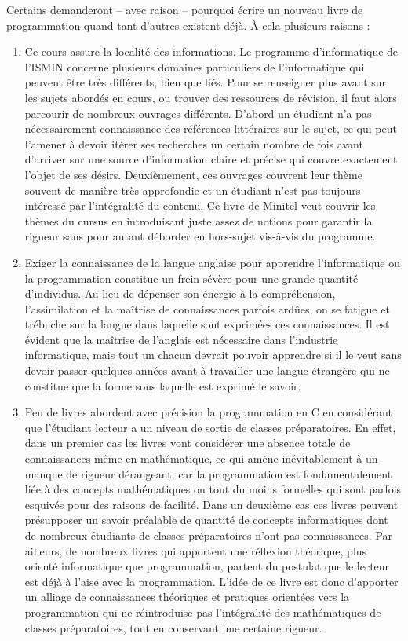 \documentclass[../main.tex]{subfiles}
\begin{document}
Certains demanderont -- avec raison -- pourquoi écrire un nouveau livre de programmation quand tant d'autres existent déjà. À cela plusieurs raisons :
\begin{enumerate}
	\item Ce cours assure la localité des informations. Le programme d'informatique de l'ISMIN concerne plusieurs domaines particuliers de l'informatique qui peuvent être très différents, bien que liés. Pour se renseigner plus avant sur les sujets abordés en cours, ou trouver des ressources de révision, il faut alors parcourir de nombreux ouvrages différents. D'abord un étudiant n'a pas nécessairement connaissance des références littéraires sur le sujet, ce qui peut l'amener à devoir itérer ses recherches un certain nombre de fois avant d'arriver sur une source d'information claire et précise qui couvre exactement l'objet de ses désirs. Deuxièmement, ces ouvrages couvrent leur thème souvent de manière très approfondie et un étudiant n'est pas toujours intéressé par l'intégralité du contenu. Ce livre de Minitel veut couvrir les thèmes du cursus en introduisant juste assez de notions pour garantir la rigueur sans pour autant déborder en hors-sujet vis-à-vis du programme.
	\item Exiger la connaissance de la langue anglaise pour apprendre l'informatique ou la programmation constitue un frein sévère pour une grande quantité d'individus. Au lieu de dépenser son énergie à la compréhension, l'assimilation et la maîtrise de connaissances parfois ardûes, on se fatigue et trébuche sur la langue dans laquelle sont exprimées ces connaissances. Il est évident que la maîtrise de l'anglais est nécessaire dans l'industrie informatique, mais tout un chacun devrait pouvoir apprendre si il le veut sans devoir passer quelques années avant à travailler une langue étrangère qui ne constitue que la forme sous laquelle est exprimé le savoir.
	\item Peu de livres abordent avec précision la programmation en C en considérant que l'étudiant lecteur a un niveau de sortie de classes préparatoires. En effet, dans un premier cas les livres vont considérer une absence totale de connaissances même en mathématique, ce qui amène inévitablement à un manque de rigueur dérangeant, car la programmation est fondamentalement liée à des concepts mathématiques ou tout du moins formelles qui sont parfois esquivés pour des raisons de facilité. Dans un deuxième cas ces livres peuvent présupposer un savoir préalable de quantité de concepts informatiques dont de nombreux étudiants de classes préparatoires n'ont pas connaissances. Par ailleurs, de nombreux livres qui apportent une réflexion théorique, plus orienté informatique que programmation, partent du postulat que le lecteur est déjà à l'aise avec la programmation. L'idée de ce livre est donc d'apporter un alliage de connaissances théoriques et pratiques orientées vers la programmation qui ne réintroduise pas l'intégralité des mathématiques de classes préparatoires, tout en conservant une certaine rigueur.

\end{enumerate}
\end{document}
